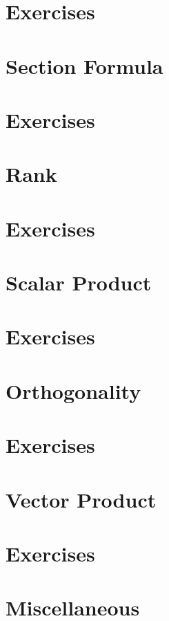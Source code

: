 \documentclass[11pt]{book}
\begin{document}
\section{Exercises}

\section{Section Formula}

\section{Exercises}

\section{Rank}

\section{Exercises}

\section{Scalar Product}

\section{Exercises}

\section{Orthogonality}

\section{Exercises}

\section{Vector Product}

\section{Exercises}

\section{Miscellaneous}

\end{document}
